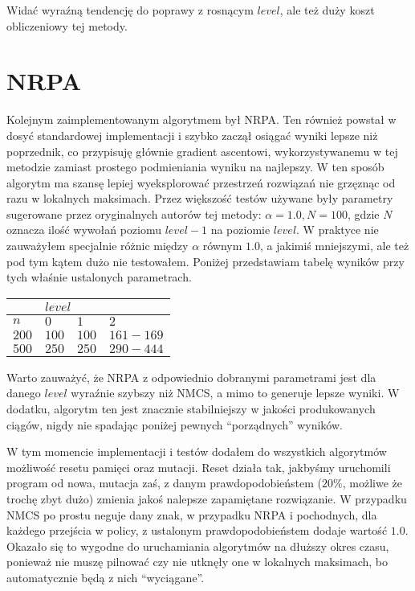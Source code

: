 \documentclass[a4paper,10pt]{article}
\begin{document}
Widać wyraźną tendencję do poprawy z rosnącym $level$, ale też duży koszt obliczeniowy tej metody.

\section{NRPA}
Kolejnym zaimplementowanym algorytmem był NRPA. Ten również powstał w dosyć standardowej implementacji i szybko zaczął osiągać wyniki
lepsze niż poprzednik, co przypisuję głównie gradient ascentowi, wykorzystywanemu w tej metodzie zamiast prostego podmieniania wyniku na
najlepszy. W ten sposób algorytm ma szansę lepiej wyeksplorować przestrzeń rozwiązań nie grzęznąc od razu w lokalnych maksimach. Przez większość
testów używane były parametry sugerowane przez oryginalnych autorów tej metody: $\alpha = 1.0, N = 100$, gdzie $N$ oznacza ilość wywołań poziomu 
$level - 1$ na poziomie $level$. W praktyce nie zauważyłem specjalnie różnic między $\alpha$ równym $1.0$, a jakimiś mniejszymi, ale też pod tym
kątem dużo nie testowałem. Poniżej przedstawiam tabelę wyników przy tych właśnie ustalonych parametrach.

\begin{adjustbox}{center}
\begin{tabularx}{0.7\linewidth}{|X|X|X|X| }
  \hline
  & \multicolumn{3}{|X|}{$level$} \\
  \hline
  $n$ & $0$ & $1$ & $2$ \\
  \hline
  $200$ & $100$ & $100$ & $161-169$ \\
  \hline
  $500$ & $250$ & $250$ & $290-444$ \\
  \hline
\end{tabularx}
\end{adjustbox}

Warto zauważyć, że NRPA z odpowiednio dobranymi parametrami jest dla danego $level$ wyraźnie szybszy niż NMCS, a mimo to generuje lepsze wyniki.
W dodatku, algorytm ten jest znacznie stabilniejszy w jakości produkowanych ciągów, nigdy nie spadając poniżej pewnych ``porządnych'' wyników.

W tym momencie implementacji i testów dodałem do wszystkich algorytmów możliwość resetu pamięci oraz mutacji. Reset działa tak, jakbyśmy
uruchomili program od nowa, mutacja zaś, z danym prawdopodobieństem ($20\%$, możliwe że trochę zbyt dużo) zmienia jakoś nalepsze zapamiętane
rozwiązanie. W przypadku NMCS po prostu neguje dany znak, w przypadku NRPA i pochodnych, dla każdego przejścia w policy, z ustalonym 
prawdopodobieństem dodaje wartość $1.0$. Okazało się to wygodne do uruchamiania algorytmów na dłuższy okres czasu, ponieważ nie muszę pilnować
czy nie utknęły one w lokalnych maksimach, bo automatycznie będą z nich ``wyciągane''.
\end{document}
